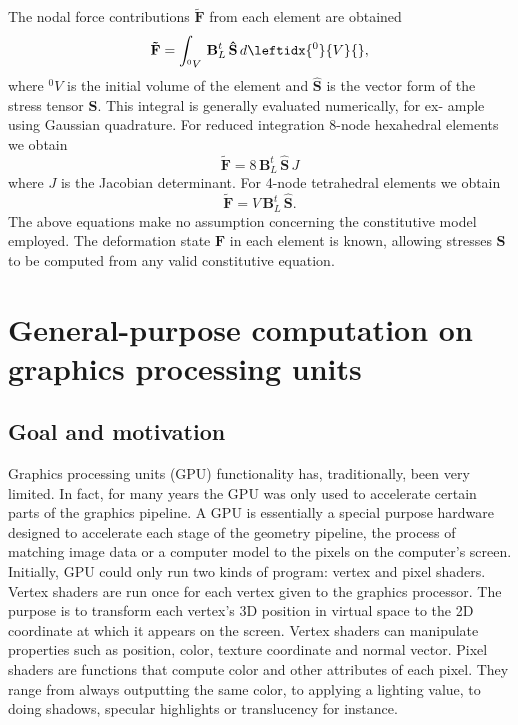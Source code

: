 \noindent The nodal force contributions $ \mathbf{\tilde{F}} $ from each element are obtained 
\begin{equation}
\mathbf{\tilde{F}} = \int_{^0 V} \, \mathbf{B}_L^t \, \mathbf{\hat{S}} \, d\leftidx{^0}{ V }{},
\end{equation}
where $ ^0 V $ is the initial volume of the element and $ \mathbf{\hat{S}} $ is the vector form of the stress tensor $ \mathbf{S} $. This integral is generally evaluated numerically, for ex- ample using Gaussian quadrature. For reduced integration 8-node hexahedral elements we obtain
\begin{equation}
\mathbf{\tilde{F}} = 8 \, \mathbf{B}_L^t \, \mathbf{\hat{S}} \, J
\end{equation}
where $ J $ is the Jacobian determinant. For 4-node tetrahedral elements we obtain
\begin{equation}
\mathbf{\tilde{F}} = V \, \mathbf{B}_L^t \, \mathbf{\hat{S}}.
\end{equation}
The above equations make no assumption concerning the constitutive model employed. The deformation state $ \mathbf{F} $ in each element is known, allowing stresses $ \mathbf{S} $ to be computed from any valid constitutive equation. 


\section{General-purpose computation on graphics processing units}

	\subsection{Goal and motivation}
Graphics processing units (GPU) functionality has, traditionally, been very limited. In fact, for many years the GPU was only used to accelerate certain parts of the graphics pipeline. A GPU is essentially a special purpose hardware designed to accelerate each stage of the geometry pipeline, the process of matching image data or a computer model to the pixels on the computer's screen. Initially, GPU could only run two kinds of program: vertex and pixel shaders. Vertex shaders are run once for each vertex given to the graphics processor. The purpose is to transform each vertex's 3D position in virtual space to the 2D coordinate at which it appears on the screen. Vertex shaders can manipulate properties such as position, color, texture coordinate and normal vector. Pixel shaders are functions that compute color and other attributes of each pixel. They range from always outputting the same color, to applying a lighting value, to doing shadows, specular highlights or translucency for instance.


